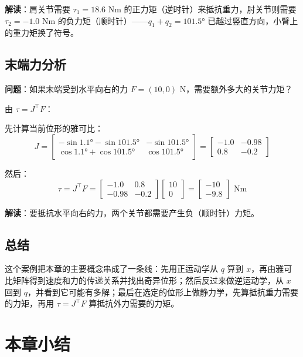 \textbf{解读}：肩关节需要 $\tau_1 = 18.6$ Nm 的正力矩（逆时针）来抵抗重力，肘关节则需要 $\tau_2 = -1.0$ Nm 的负力矩（顺时针）——$q_1 + q_2 = 101.5°$ 已越过竖直方向，小臂上的重力矩换了符号。

\subsection{末端力分析}

\textbf{问题}：如果末端受到水平向右的力 $F = (10, 0)$ N，需要额外多大的关节力矩？

由 $\tau = J^\top F$：

先计算当前位形的雅可比：
\[
J = \begin{bmatrix}
-\sin 1.1° - \sin 101.5° & -\sin 101.5° \\
\cos 1.1° + \cos 101.5° & \cos 101.5°
\end{bmatrix}
= \begin{bmatrix}
-1.0 & -0.98 \\
0.8 & -0.2
\end{bmatrix}
\]

然后：
\[
\tau = J^\top F = \begin{bmatrix} -1.0 & 0.8 \\ -0.98 & -0.2 \end{bmatrix} \begin{bmatrix} 10 \\ 0 \end{bmatrix}
= \begin{bmatrix} -10 \\ -9.8 \end{bmatrix} \text{ Nm}
\]

\textbf{解读}：要抵抗水平向右的力，两个关节都需要产生负（顺时针）力矩。

\subsection{总结}

这个案例把本章的主要概念串成了一条线：先用正运动学从 $q$ 算到 $x$，再由雅可比矩阵得到速度和力的传递关系并找出奇异位形；然后反过来做逆运动学，从 $x$ 回到 $q$，并看到它可能有多解；最后在选定的位形上做静力学，先算抵抗重力需要的力矩，再用 $\tau = J^\top F$ 算抵抗外力需要的力矩。

\section{本章小结}

